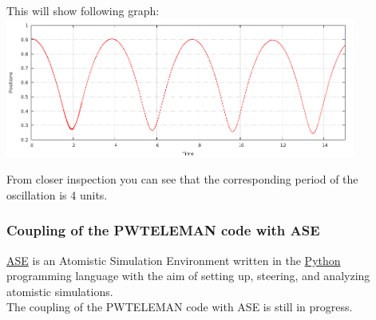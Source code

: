 \documentclass[10pt]{beamer}
\begin{document}


\begin{frame}
This will show following graph:\\

\centering
 \includegraphics[width=11.5cm]{fig/period}

From closer inspection you can see that the corresponding period of the oscillation is 4 units.

\end{frame}




\begin{frame}
\frametitle{Coupling of the PWTELEMAN code with ASE}

\begin{block}{}
   \href{https://wiki.fysik.dtu.dk/ase/overview.html}{ASE} is an Atomistic Simulation Environment written in the \href{http://www.python.org/}{Python} programming language with the aim of setting up, steering, and analyzing atomistic simulations.\\
    The coupling of the PWTELEMAN code with ASE  is still in progress.
   \end{block}
   \vspace*{1.2cm}


\end{frame}
\end{document}
